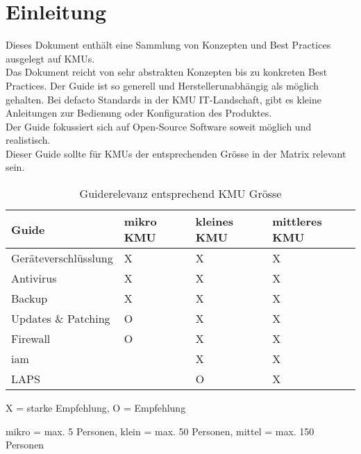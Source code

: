 \chapter{Einleitung}
Dieses Dokument enthält eine Sammlung von Konzepten und Best Practices ausgelegt auf KMUs.\\

Das Dokument reicht von sehr abstrakten Konzepten bis zu konkreten Best Practices.
Der Guide ist so generell und Herstellerunabhängig als möglich gehalten.
Bei defacto Standards in der KMU IT-Landschaft, gibt es kleine Anleitungen zur Bedienung oder Konfiguration des Produktes.\\

Der Guide fokussiert sich auf Open-Source Software soweit möglich und realistisch.\\

Dieser Guide sollte für KMUs der entsprechenden Grösse in der Matrix relevant sein.

\begin{table}[H]
    \begin{center}
        \begin{tabular}{l|l|l|l}
            Guide                & mikro KMU & kleines KMU & mittleres KMU\\
            \hline
            Geräteverschlüsslung & X         & X             & X\\
            Antivirus            & X         & X             & X\\
            Backup               & X         & X             & X\\
            Updates \& Patching  & O         & X             & X\\
            Firewall             & O         & X             & X\\
            \acrshort{iam}       &           & X             & X\\
            LAPS                 &           & O             & X\\
        \end{tabular}
        \caption*{X = starke Empfehlung, O = Empfehlung}
        \vspace{-3mm}
        \caption*{mikro = max. 5 Personen, klein = max. 50 Personen, mittel = max. 150 Personen}
    \end{center}
    \caption{Guiderelevanz entsprechend KMU Grösse}
\end{table}